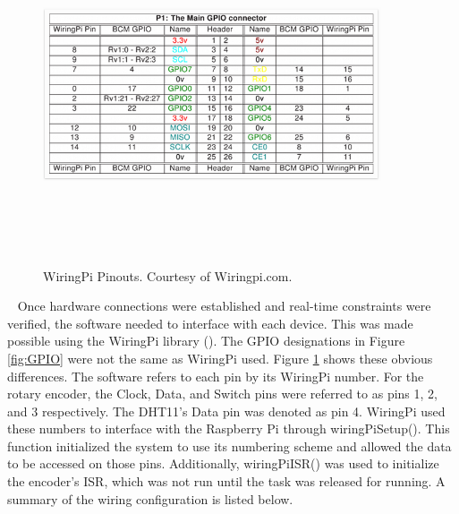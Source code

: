 \documentclass[letterpaper, 12pt]{article}
\begin{document}
\begin{figure}[H]
	\centering
	\includegraphics[width=10cm,height=10cm,keepaspectratio]{pi_pins.png}
	\caption[Pinouts]{WiringPi Pinouts. Courtesy of Wiringpi.com.}
	\label{fig:pinouts}
\end{figure}
~\newpage
\indent Once hardware connections were established and real-time constraints were verified, the software needed to interface with each device.  This was made possible using the WiringPi library (\cite{gordonhenderson2018}).  The GPIO designations in Figure \ref{fig:GPIO} were not the same as WiringPi used.  Figure \ref{fig:pinouts} shows these obvious differences. The software refers to each pin by its WiringPi number.  For the rotary encoder, the Clock, Data, and Switch pins were referred to as pins 1, 2, and 3 respectively.  The DHT11's Data pin was denoted as pin 4.  WiringPi used these numbers to interface with the Raspberry Pi through wiringPiSetup().  This function initialized the system to use its numbering scheme and allowed the data to be accessed on those pins.  Additionally, wiringPiISR() was used to initialize the encoder's ISR, which was not run until the task was released for running. A summary of the wiring configuration is listed below.
\end{document}
